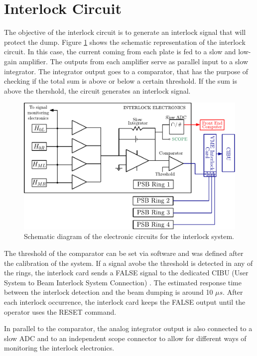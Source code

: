 \section{Interlock Circuit}

The objective of the interlock circuit is to generate an interlock signal that will protect the \hzhm dump. Figure \ref{fig:InterlockCir} shows the schematic representation of the interlock circuit. In this case, the current coming from each plate is fed to a slow and low-gain amplifier. The outputs from each amplifier serve as parallel input to a slow integrator. The integrator output goes to a comparator, that has the purpose of checking if the total sum is above or below a certain threshold. If the sum is above the thershold, the circuit generates an interlock signal. 

\begin{figure}[h]
    \centering
    \includegraphics[width=0.9\columnwidth]{Figure_ElectronicSchema/InterlockElectronics.pdf}
    \caption{Schematic diagram of the electronic circuits for the interlock system.}
    \label{fig:InterlockCir}
\end{figure}

The threshold of the comparator can be set via software and was defined after the calibration of the system. If a signal avobe the threshold is detected in any of the rings, the interlock card sends a FALSE signal to the dedicated CIBU (User System to Beam Interlock System Connection) \parencite[][]{ref:CIBU}. The estimated response time between the interlock detection and the beam dumping is around 10 $\mu s$. After each interlock occurrence, the interlock card keeps the FALSE output until the operator uses the RESET command. 

In parallel to the comparator, the analog integrator output is also connected to a slow ADC and to an independent scope connector to allow for different ways of monitoring the interlock electronics. 

